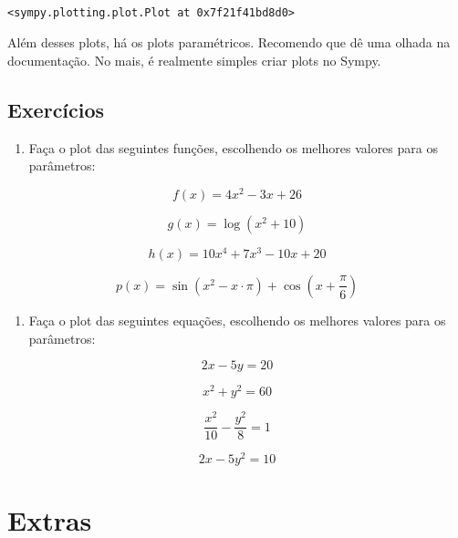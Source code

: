 \documentclass[a4paper, 11pt, brazilian]{article}
\makeatletter
\providecommand{\tightlist}{%
      \setlength{\itemsep}{0pt}\setlength{\parskip}{0pt}}
\newcommand{\boxspacing}{\kern\kvtcb@left@rule\kern\kvtcb@boxsep}
\newcommand{\prompt}[4]{
        \ttfamily\llap{{\color{#2}[#3]:\hspace{3pt}#4}}\vspace{-\baselineskip}
    }
\makeatother
\begin{document}
    \begin{center}
    \end{center}
    { \hspace*{\fill} \\}
    
            \begin{tcolorbox}[breakable, size=fbox, boxrule=.5pt, pad at break*=1mm, opacityfill=0]
\prompt{Out}{outcolor}{11}{\boxspacing}
\begin{Verbatim}[commandchars=\\\{\}]
<sympy.plotting.plot.Plot at 0x7f21f41bd8d0>
\end{Verbatim}
\end{tcolorbox}
        
    Além desses plots, há os plots paramétricos. Recomendo que dê uma olhada
na documentação. No mais, é realmente simples criar plots no Sympy.

\hypertarget{exercuxedcios}{%
\subsection{Exercícios}\label{exercuxedcios}}

\begin{enumerate}
\def\labelenumi{\arabic{enumi}.}
\tightlist
\item
  Faça o plot das seguintes funções, escolhendo os melhores valores para
  os parâmetros:
\end{enumerate}

\[f(x) = 4x^2 - 3x + 26\]

\[g(x) = \log(x^2 + 10)\]

\[h(x) = 10x^4 + 7x^3 - 10x + 20\]

\[p(x) = \sin(x^2 - x\cdot \pi) + \cos\left(x + \dfrac{\pi}{6}\right)\]

\begin{enumerate}
\def\labelenumi{\arabic{enumi}.}
\setcounter{enumi}{1}
\tightlist
\item
  Faça o plot das seguintes equações, escolhendo os melhores valores
  para os parâmetros:
\end{enumerate}

\[ 2x - 5y = 20\]

\[x^2 + y^2 = 60\]

\[\dfrac{x^2}{10} - \dfrac{y^2}{8} = 1\]

\[2x - 5y^2 = 10\]

    \hypertarget{extras}{%
\section{Extras}\label{extras}}
\end{document}
